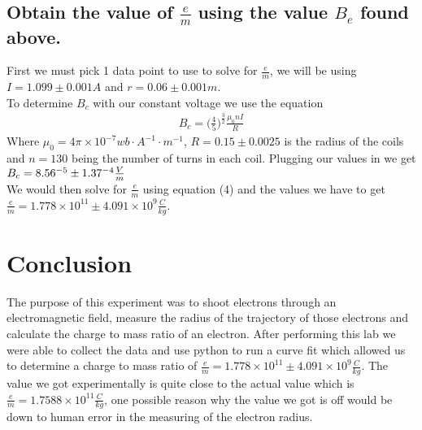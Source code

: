 \documentclass{article}
\begin{document}
\subsection*{Obtain the value of $\frac{e}{m}$ using the value $B_e$ found above.}
First we must pick 1 data point to use to solve for $\frac{e}{m}$, we will be
using $I = 1.099 \pm 0.001 A$ and $r = 0.06 \pm 0.001 m$.\\
To determine $B_c$ with our constant voltage we use the equation
\begin{align*}
    B_c = \bigg(\frac{4}{5}\bigg)^{\frac{3}{2}}\frac{\mu_0nI}{R}
\end{align*}
Where $\mu_0 = 4\pi\times10^{-7}wb\cdot A^{-1}\cdot m^{-1}$, $R = 0.15 \pm 0.0025$
is the radius of the coils and $n = 130$ being the number of turns in each coil.
Plugging our values in we get $B_c = 8.56\time10^{-5} \pm 1.37\time10^{-4}\frac{V}{m}$\\
We would then solve for $\frac{e}{m}$ using equation (4) and the values we have
to get $\frac{e}{m} = 1.778\times 10^{11} \pm 4.091\times10^{9}\frac{C}{kg}$.
\section{Conclusion}
The purpose of this experiment was to shoot electrons through an electromagnetic
field, measure the radius of the trajectory of those electrons and calculate the
charge to mass ratio of an electron. After performing this lab we were able to
collect the data and use python to run a curve fit which allowed us to determine
a charge to mass ratio of $\frac{e}{m} = 1.778\times 10^{11} \pm 4.091\times10^{9}\frac{C}{kg}$.
The value we got experimentally is quite close to the actual value which is
$\frac{e}{m} = 1.7588\times10^{11}\frac{C}{kg}$, one possible reason why the value
we got is off would be down to human error in the measuring of the electron radius.
\end{document}
